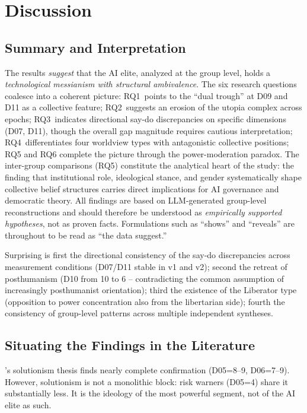 \documentclass[12pt,a4paper]{article}
\begin{document}
\section{Discussion}
\label{sec:diskussion}

\subsection{Summary and Interpretation}
\label{sec:diskussion:zusammenfassung}

The results \emph{suggest} that the AI elite, analyzed at the group level, holds a \emph{technological messianism with structural ambivalence}. The six research questions coalesce into a coherent picture: RQ1~points to the ``dual trough'' at D09 and D11 as a collective feature; RQ2~suggests an erosion of the utopia complex across epochs; RQ3~indicates directional say-do discrepancies on specific dimensions (D07, D11), though the overall gap magnitude requires cautious interpretation; RQ4~differentiates four worldview types with antagonistic collective positions; RQ5 and RQ6 complete the picture through the power-moderation paradox. The inter-group comparisons (RQ5) constitute the analytical heart of the study: the finding that institutional role, ideological stance, and gender systematically shape collective belief structures carries direct implications for AI governance and democratic theory. All findings are based on LLM-generated group-level reconstructions and should therefore be understood as \emph{empirically supported hypotheses}, not as proven facts. Formulations such as ``shows'' and ``reveals'' are throughout to be read as ``the data suggest.''

Surprising is first the directional consistency of the say-do discrepancies across measurement conditions (D07/D11 stable in v1 and v2); second the retreat of posthumanism (D10 from 10 to 6 -- contradicting the common assumption of increasingly posthumanist orientation); third the existence of the Liberator type (opposition to power concentration also from the libertarian side); fourth the consistency of group-level patterns across multiple independent syntheses.


\subsection{Situating the Findings in the Literature}
\label{sec:diskussion:einordnung}

\citeauthor{Morozov2013}'s solutionism thesis finds nearly complete confirmation (D05=8--9, D06=7--9). However, solutionism is not a monolithic block: risk warners (D05=4) share it substantially less. It is the ideology of the most powerful segment, not of the AI elite as such.
\end{document}
